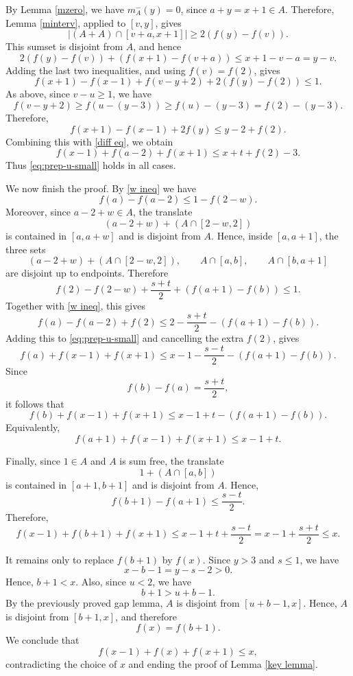 \documentclass[11pt,reqno]{amsart}
\theoremstyle{definition}
\def\F#1{f(#1)}
\begin{document}
    By Lemma \ref{mzero}, we have $m_A^-(y)=0$, since $a+y=x+1\in A$.
    Therefore,   Lemma \ref{minterv}, applied to $[v,y]$, gives
    $$
        |(A+A)\cap[v+a,x+1]|\geq 2(\F{y}-\F{v}).
    $$
    This sumset is disjoint from $A$, and hence
    $$
        2(\F{y}-\F{v})+(\F{x+1}-\F{v+a})\leq x+1-v-a=y-v.
    $$
    Adding the last two inequalities, and using $\F{v}=\F{2}$, gives
    $$
        \F{x+1}-\F{x-1}+\F{v-y+2}+2(\F{y}-\F{2})\leq1.
    $$
    As above, since $v-u\geq1$, we have
    $$
        \F{v-y+2}\geq \F{u-(y-3)}\geq \F{u}-(y-3)=\F{2}-(y-3).
    $$
    Therefore,
    $$
        \F{x+1}-\F{x-1}+2\F{y}\leq y-2+\F{2}.
    $$
    Combining this with \eqref{diff eq}, we obtain
    $$
        \F{x-1}+\F{a-2}+\F{x+1}
        \leq x+t+\F{2}-3.
    $$
    Thus \eqref{eq:prep-u-small} holds in all cases.
\bigskip

We now finish the proof. By \eqref{w ineq} we have
    $$
        \F{a}-\F{a-2}\leq1-\F{2-w}.
    $$
    Moreover, since $a-2+w\in A$, the translate
    $$
        (a-2+w)+(A\cap[2-w,2])
    $$
    is contained in $[a,a+w]$ and is disjoint from $A$. Hence, inside
    $[a,a+1]$, the three sets
    $$
        (a-2+w)+(A\cap[2-w,2]),\qquad
        A\cap[a,b],\qquad
        A\cap[b,a+1]
    $$
    are disjoint up to endpoints. 
    Therefore
    $$
        \F{2}-\F{2-w}+\frac{s+t}{2}+(\F{a+1}-\F{b})\leq1.
    $$
    Together with \eqref{w ineq}, this gives
    $$
        \F{a}-\F{a-2}+\F{2}
        \leq
        2-\frac{s+t}{2}-(\F{a+1}-\F{b}).
    $$
    Adding this to \eqref{eq:prep-u-small} and cancelling the extra $\F{2}$,
    gives
    $$
        \F{a}+\F{x-1}+\F{x+1}
        \leq
        x-1-\frac{s-t}{2}-(\F{a+1}-\F{b}).
    $$
    Since
    $$
        \F{b}-\F{a}=\frac{s+t}{2},
    $$
    it follows that
    $$
        \F{b}+\F{x-1}+\F{x+1}
        \leq
        x-1+t-(\F{a+1}-\F{b}).
    $$
    Equivalently,
    $$
        \F{a+1}+\F{x-1}+\F{x+1}\leq x-1+t.
    $$

    Finally, since $1\in A$ and $A$ is sum free, the translate
    $$
        1+(A\cap[a,b])
    $$
    is contained in $[a+1,b+1]$ and is disjoint from $A$. Hence,
    $$
        \F{b+1}-\F{a+1}\leq\frac{s-t}{2}.
    $$
    Therefore,
    $$
        \F{x-1}+\F{b+1}+\F{x+1}
        \leq
        x-1+t+\frac{s-t}{2}
        =
        x-1+\frac{s+t}{2}
        \leq x.
    $$

    It remains only to replace $\F{b+1}$ by $\F{x}$. Since $y>3$ and $s\leq1$,
    we have
    $$
        x-b-1=y-s-2>0.
    $$
    Hence,   $b+1<x$. Also, since $u<2$, we have
    $$
        b+1>u+b-1.
    $$
    By the previously proved gap lemma, $A$ is disjoint from $[u+b-1,x]$.
    Hence,   $A$ is disjoint from $[b+1,x]$, and therefore
    $$
        \F{x}=\F{b+1}.
    $$
    We conclude that
    $$
        \F{x-1}+\F{x}+\F{x+1}\leq x,
    $$
    contradicting the choice of $x$ and ending the proof of Lemma \ref{key lemma}.



\end{document}
